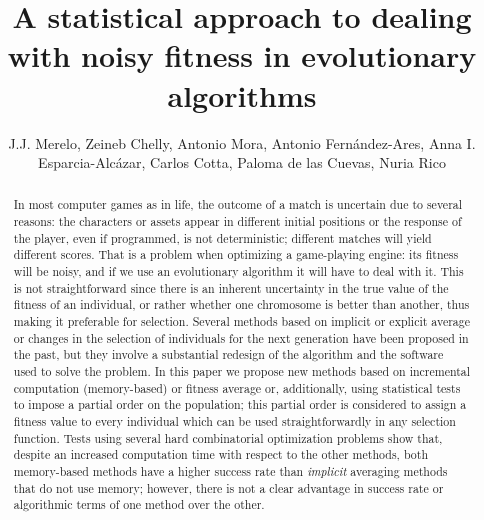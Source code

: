 \documentclass{llncs}
\begin{document}
\title{A statistical approach to dealing with noisy fitness in evolutionary algorithms}

\author{J.J. Merelo, Zeineb Chelly, Antonio
  Mora, Antonio Fern\'andez-Ares, Anna
  I. Esparcia-Alc\'azar, Carlos Cotta, Paloma de las Cuevas, Nuria
  Rico}

\maketitle

\begin{abstract}
In most computer games as in life, the outcome of a match is uncertain due
  to several reasons: the characters or assets appear in different initial
  positions or the response of the player, even if programmed, is not
  deterministic; different matches will yield different scores. That is a
  problem when optimizing a game-playing engine: its fitness will be
  noisy, and if we use an evolutionary algorithm it will have to deal
  with it. This is not straightforward since there is an inherent
uncertainty in the true value of the fitness of an individual, or
rather whether one chromosome is better than another, thus making it preferable for selection.
Several methods based on implicit or explicit average or
changes in the selection of individuals for the next generation have been proposed in the past, 
but they involve a substantial redesign of the algorithm and the
software used to solve the problem. In this paper we propose  new
methods based on incremental computation (memory-based) or fitness average or, additionally, using
statistical tests to impose a partial order on the population; this
partial order is considered to assign a fitness value to every individual
which can be used straightforwardly in any selection function. 
Tests using several
hard combinatorial optimization problems show that, despite
an increased computation time with respect to the other methods, both memory-based methods have a higher
success rate than {\em implicit} averaging methods that do not use
memory; however, there is not a clear advantage in success rate or
algorithmic terms of one method over the other. 

\end{abstract}
\end{document}
